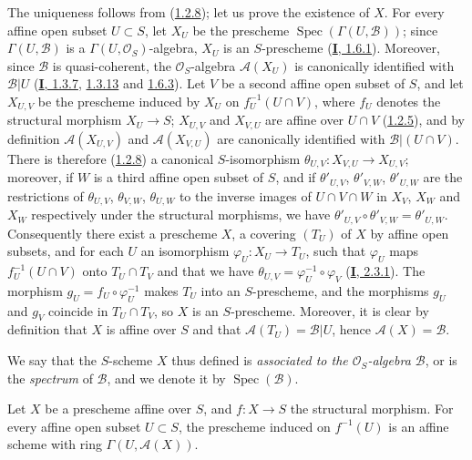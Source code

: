 The uniqueness follows from (\hyperref[II.1.2.8]{1.2.8}); let us prove
the existence of $X$. For every affine open subset $U\subset S$, let $X_U$ be
the prescheme $\operatorname{Spec}(\Gamma(U,\mathcal{B}))$; since
$\Gamma(U,\mathcal{B})$ is a $\Gamma(U,\mathcal{O}_S)$-algebra, $X_U$
is an $S$-prescheme (\hyperref[I.1.6.1]{\textbf{I}, 1.6.1}). Moreover, since
$\mathcal{B}$ is quasi-coherent, the $\mathcal{O}_S$-algebra
$\mathcal{A}(X_U)$ is canonically identified with $\mathcal{B}|U$
(\hyperref[I.1.3.7]{\textbf{I}, 1.3.7},
\hyperref[I.1.3.13]{1.3.13} and
\hyperref[I.1.6.3]{1.6.3}). Let $V$ be a second affine open subset of
$S$, and let $X_{U,V}$ be the prescheme induced by $X_U$ on
$f_U^{-1}(U\cap V)$, where $f_U$ denotes the structural morphism
$X_U\to S$; $X_{U,V}$ and
$X_{V,U}$ are affine over $U\cap V$
(\hyperref[II.1.2.5]{1.2.5}), and by definition $\mathcal{A}(X_{U,V})$
and $\mathcal{A}(X_{V,U})$ are canonically identified with
$\mathcal{B}|(U\cap V)$. There is therefore
(\hyperref[II.1.2.8]{1.2.8}) a canonical $S$-isomorphism
$\theta_{U,V}:X_{V,U}\to X_{U,V}$; moreover, if $W$ is a third
affine open subset of $S$, and if $\theta'_{U,V}$, $\theta'_{V,W}$,
$\theta'_{U,W}$ are the restrictions of $\theta_{U,V}$, $\theta_{V,W}$,
$\theta_{U,W}$ to the inverse images of $U\cap V\cap W$ in $X_V$,
$X_W$ and $X_W$ respectively under the structural morphisms, we have
$\theta'_{U,V}\circ\theta'_{V,W}=\theta'_{U,W}$. Consequently there exist a
prescheme $X$, a covering $(T_U)$ of $X$ by affine open subsets, and
for each $U$ an isomorphism $\varphi_U:X_U\to T_U$, such that
$\varphi_U$ maps $f_U^{-1}(U\cap V)$ onto $T_U\cap T_V$ and that we have
$\theta_{U,V}=\varphi_U^{-1}\circ\varphi_V$
(\hyperref[I.2.3.1]{\textbf{I}, 2.3.1}). The morphism
$g_U=f_U\circ\varphi_U^{-1}$ makes $T_U$ into an $S$-prescheme, and the
morphisms $g_U$ and $g_V$ coincide in $T_U\cap T_V$, so $X$ is an
$S$-prescheme. Moreover, it is clear by definition that $X$ is affine
over $S$ and that $\mathcal{A}(T_U)=\mathcal{B}|U$, hence
$\mathcal{A}(X)=\mathcal{B}$.

We say that the $S$-scheme $X$ thus defined is \emph{associated to the
$\mathcal{O}_S$-algebra $\mathcal{B}$}, or is the \emph{spectrum} of
$\mathcal{B}$, and we denote it by $\operatorname{Spec}(\mathcal{B})$.

\begin{corollary}[1.3.2]
\label{II.1.3.2}
Let $X$ be a prescheme affine over $S$, and $f:X\to S$ the structural
morphism. For every affine open subset $U\subset S$, the prescheme induced
on $f^{-1}(U)$ is an affine scheme with ring
$\Gamma(U,\mathcal{A}(X))$.
\end{corollary}

